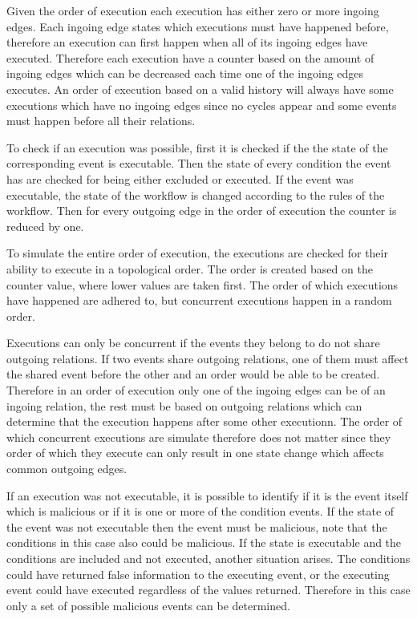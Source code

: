     Given the order of execution each execution has either zero or more ingoing edges. Each ingoing edge states which executions must have happened before, therefore an execution can first happen when all of its ingoing edges have executed. Therefore each execution have a counter based on the amount of ingoing edges which can be decreased each time one of the ingoing edges executes. An order of execution based on a valid history will always have some executions which have no ingoing edges since no cycles appear and some events must happen before all their relations. 
    
    \newpar To check if an execution was possible, first it is checked if the the state of the corresponding event is executable. Then the state of every condition the event has are checked for being either excluded or executed. If the event was executable, the state of the workflow is changed according to the rules of the workflow. Then for every outgoing edge in the order of execution the counter is reduced by one. 
    
    \newpar To simulate the entire order of execution, the executions are checked for their ability to execute in a topological order. The order is created based on the counter value, where lower values are taken first. The order of which executions have happened are adhered to, but concurrent executions happen in a random order.
    
    Executions can only be concurrent if the events they belong to do not share outgoing relations. If two events share outgoing relations, one of them must affect the shared event before the other and an order would be able to be created. Therefore in an order of execution only one of the ingoing edges can be of an ingoing relation, the rest must be based on outgoing relations which can determine that the execution happens after some other executionn. The order of which concurrent executions are simulate therefore does not matter since they order of which they execute can only result in one state change which affects common outgoing edges.
    
    \newpar If an execution was not executable, it is possible to identify if it is the event itself which is malicious or if it is one or more of the condition events. If the state of the event was not executable then the event must be malicious, note that the conditions in this case also could be malicious. If the state is executable and the conditions are included and not executed, another situation arises. The conditions could have returned false information to the executing event, or the executing event could have executed regardless of the values returned. Therefore in this case only a set of possible malicious events can be determined.

